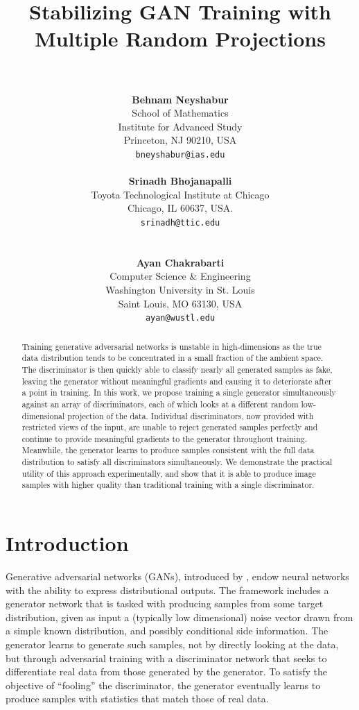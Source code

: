 \documentclass{article}
\title{\vspace{-3em}\bf Stabilizing GAN Training with\\Multiple Random Projections\\~}
\date{}
\author{%
  \parbox[t]{15em}{\centering%
    \textbf{Behnam Neyshabur}\\
    School of Mathematics\\
    Institute for Advanced Study\\
    Princeton, NJ 90210, USA \\
    \texttt{bneyshabur@ias.edu}
  }~\parbox[t]{19em}{\centering%
      \textbf{Srinadh Bhojanapalli}\\
      Toyota Technological Institute at Chicago\\
      Chicago, IL 60637, USA.\\
      \texttt{srinadh@ttic.edu}
  }\vspace{2em}\\~\parbox[c]{\textwidth}{\centering%
    \textbf{Ayan Chakrabarti}\\
    Computer Science \& Engineering\\
    Washington University in St. Louis\\
    Saint Louis, MO 63130, USA\\
    \texttt{ayan@wustl.edu}
  }
}
\begin{document}
 

\maketitle

\begin{abstract} 
  Training generative adversarial networks is unstable in high-dimensions as the true data distribution tends to be concentrated in a small fraction of the ambient space. The discriminator is then quickly able to classify nearly all generated samples as fake, leaving the generator without meaningful gradients and causing it to deteriorate after a point in training. In this work, we propose training a single generator simultaneously against an array of discriminators, each of which looks at a different random low-dimensional projection of the data. Individual discriminators, now provided with restricted views of the input, are unable to reject generated samples perfectly and continue to provide meaningful gradients to the generator throughout training.  Meanwhile, the generator learns to produce samples consistent with the full data distribution to satisfy all discriminators simultaneously. We  demonstrate the practical utility of this approach experimentally, and show that it is able to produce image samples with higher quality than traditional training with a single discriminator.
\end{abstract} 

\section{Introduction}
\label{sec:intro}

Generative adversarial networks (GANs), introduced by \cite{goodfellow2014generative}, endow neural networks with the ability to express distributional outputs. The framework includes a generator network that is tasked with producing samples from some target distribution, given as input a (typically low dimensional) noise vector drawn from a simple known distribution, and possibly conditional side information. The generator learns to generate such samples, not by directly looking at the data, but through adversarial training with a discriminator network that seeks to differentiate real data from those generated by the generator. To satisfy the objective of ``fooling'' the discriminator, the generator eventually learns to produce samples with statistics that match those of real data. 
\end{document}
